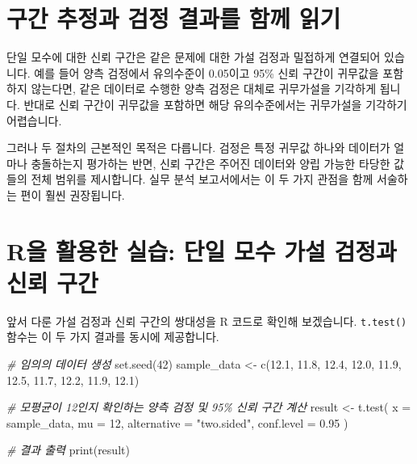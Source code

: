 \documentclass[
]{scrbook}
\newenvironment{Shaded}{}{}
\newcommand{\AttributeTok}[1]{\textcolor[rgb]{0.49,0.56,0.16}{#1}}
\newcommand{\CommentTok}[1]{\textcolor[rgb]{0.38,0.63,0.69}{\textit{#1}}}
\newcommand{\DecValTok}[1]{\textcolor[rgb]{0.25,0.63,0.44}{#1}}
\newcommand{\FloatTok}[1]{\textcolor[rgb]{0.25,0.63,0.44}{#1}}
\newcommand{\FunctionTok}[1]{\textcolor[rgb]{0.02,0.16,0.49}{#1}}
\newcommand{\NormalTok}[1]{#1}
\newcommand{\OtherTok}[1]{\textcolor[rgb]{0.00,0.44,0.13}{#1}}
\newcommand{\StringTok}[1]{\textcolor[rgb]{0.25,0.44,0.63}{#1}}
\begin{document}
\section{구간 추정과 검정 결과를 함께
읽기}\label{uxad6cuxac04-uxcd94uxc815uxacfc-uxac80uxc815-uxacb0uxacfcuxb97c-uxd568uxaed8-uxc77duxae30}

단일 모수에 대한 신뢰 구간은 같은 문제에 대한 가설 검정과 밀접하게
연결되어 있습니다. 예를 들어 양측 검정에서 유의수준이 0.05이고 95\% 신뢰
구간이 귀무값을 포함하지 않는다면, 같은 데이터로 수행한 양측 검정은
대체로 귀무가설을 기각하게 됩니다. 반대로 신뢰 구간이 귀무값을 포함하면
해당 유의수준에서는 귀무가설을 기각하기 어렵습니다.

그러나 두 절차의 근본적인 목적은 다릅니다. 검정은 특정 귀무값 하나와
데이터가 얼마나 충돌하는지 평가하는 반면, 신뢰 구간은 주어진 데이터와
양립 가능한 타당한 값들의 전체 범위를 제시합니다. 실무 분석 보고서에서는
이 두 가지 관점을 함께 서술하는 편이 훨씬 권장됩니다.

\section{R을 활용한 실습: 단일 모수 가설 검정과 신뢰
구간}\label{ruxc744-uxd65cuxc6a9uxd55c-uxc2e4uxc2b5-uxb2e8uxc77c-uxbaa8uxc218-uxac00uxc124-uxac80uxc815uxacfc-uxc2e0uxb8b0-uxad6cuxac04}

앞서 다룬 가설 검정과 신뢰 구간의 쌍대성을 R 코드로 확인해 보겠습니다.
\texttt{t.test()} 함수는 이 두 가지 결과를 동시에 제공합니다.

\begin{Shaded}
\begin{Highlighting}[]
\CommentTok{\# 임의의 데이터 생성}
\FunctionTok{set.seed}\NormalTok{(}\DecValTok{42}\NormalTok{)}
\NormalTok{sample\_data }\OtherTok{\textless{}{-}} \FunctionTok{c}\NormalTok{(}\FloatTok{12.1}\NormalTok{, }\FloatTok{11.8}\NormalTok{, }\FloatTok{12.4}\NormalTok{, }\FloatTok{12.0}\NormalTok{, }\FloatTok{11.9}\NormalTok{, }\FloatTok{12.5}\NormalTok{, }\FloatTok{11.7}\NormalTok{, }\FloatTok{12.2}\NormalTok{, }\FloatTok{11.9}\NormalTok{, }\FloatTok{12.1}\NormalTok{)}

\CommentTok{\# 모평균이 12인지 확인하는 양측 검정 및 95\% 신뢰 구간 계산}
\NormalTok{result }\OtherTok{\textless{}{-}} \FunctionTok{t.test}\NormalTok{(}
  \AttributeTok{x =}\NormalTok{ sample\_data,}
  \AttributeTok{mu =} \DecValTok{12}\NormalTok{,}
  \AttributeTok{alternative =} \StringTok{"two.sided"}\NormalTok{,}
  \AttributeTok{conf.level =} \FloatTok{0.95}
\NormalTok{)}

\CommentTok{\# 결과 출력}
\FunctionTok{print}\NormalTok{(result)}
\end{Highlighting}
\end{Shaded}
\end{document}
